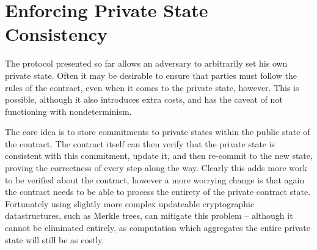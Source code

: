 \section{Enforcing Private State Consistency}
\label{sec:pstateconsistency}

The protocol presented so far allows an adversary to arbitrarily set his own
private state. Often it may be desirable to ensure that parties must follow the
rules of the contract, even when it comes to the private state, however. This is
possible, although it also introduces extra costs, and has the caveat of not
functioning with nondeterminism.

The core idea is to store commitments to private states within the public state
of the contract. The contract itself can then verify that the private state is
consistent with this commitment, update it, and then re-commit to the new state,
proving the correctness of every step along the way. Clearly this adds more work
to be verified about the contract, however a more worrying change is that again
the contract needs to be able to process the entirety of the private contract
state. Fortunately using slightly more complex updateable cryptographic
datastructures, such as Merkle trees, can mitigate this problem -- although it
cannot be eliminated entirely, as computation which aggregates the entire
private state will still be as costly.

